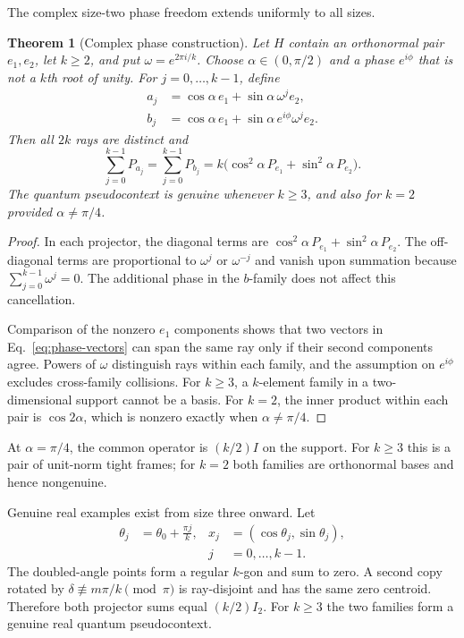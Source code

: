 \documentclass[
  twocolumn,
  aps,
  pra,
  floatfix,
  amsmath,amssymb,
  longbibliography
]{revtex4-2}
\newtheorem{theorem}{Theorem}
\theoremstyle{definition}
\theoremstyle{remark}
\newcommand{\1}{\mathbf 1}
\begin{document}
The complex size-two phase freedom extends uniformly to all sizes.

\begin{theorem}[Complex phase construction]
\label{thm:complex-phase}
Let $H$ contain an orthonormal pair $e_1,e_2$, let $k\ge2$, and put
$\omega=e^{2\pi i/k}$.  Choose $\alpha\in(0,\pi/2)$ and a phase $e^{i\phi}$
that is not a $k$th root of unity.  For $j=0,\ldots,k-1$, define
\begin{align}
 a_j&=\cos\alpha\,e_1+\sin\alpha\,\omega^j e_2,\nonumber\\
 b_j&=\cos\alpha\,e_1+\sin\alpha\,e^{i\phi}\omega^j e_2.
 \label{eq:phase-vectors}
\end{align}
Then all $2k$ rays are distinct and
\begin{equation}
 \sum_{j=0}^{k-1}P_{a_j}=\sum_{j=0}^{k-1}P_{b_j}
 =k\bigl(\cos^2\alpha\,P_{e_1}+\sin^2\alpha\,P_{e_2}\bigr).
 \label{eq:phase-T}
\end{equation}
The quantum pseudocontext is genuine whenever $k\ge3$, and also for $k=2$
provided $\alpha\ne\pi/4$.
\end{theorem}

\begin{proof}
In each projector, the diagonal terms are
$\cos^2\alpha\,P_{e_1}+\sin^2\alpha\,P_{e_2}$.  The off-diagonal terms are
proportional to $\omega^j$ or $\omega^{-j}$ and vanish upon summation because
$\sum_{j=0}^{k-1}\omega^j=0$.  The additional phase in the $b$-family does
not affect this cancellation.

Comparison of the nonzero $e_1$ components shows that two vectors in
Eq.~\eqref{eq:phase-vectors} can span the same ray only if their second
components agree.  Powers of $\omega$ distinguish rays within each family,
and the assumption on $e^{i\phi}$ excludes cross-family collisions.  For
$k\ge3$, a $k$-element family in a two-dimensional support cannot be a basis.
For $k=2$, the inner product within each pair is $\cos2\alpha$, which is
nonzero exactly when $\alpha\ne\pi/4$.
\end{proof}

At $\alpha=\pi/4$, the common operator is $(k/2)I$ on the support.  For
$k\ge3$ this is a pair of unit-norm tight frames; for $k=2$ both families are
orthonormal bases and hence nongenuine.

Genuine real examples exist from size three onward.  Let
\begin{equation}
 \begin{aligned}
  \theta_j&=\theta_0+\frac{\pi j}{k},
  &x_j&=(\cos\theta_j,\sin\theta_j),\\
  &&j&=0,\ldots,k-1.
 \end{aligned}
 \label{eq:real-polygons}
\end{equation}
The doubled-angle points form a regular $k$-gon and sum to zero.  A second
copy rotated by
$\delta\not\equiv m\pi/k\pmod\pi$ is ray-disjoint and has the same zero
centroid.  Therefore both projector sums equal $(k/2)I_2$.  For $k\ge3$ the
two families form a genuine real quantum pseudocontext.
\end{document}
